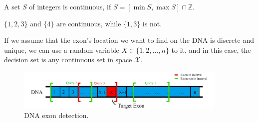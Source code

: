 \begin{definition}
A set $S$ of integers is continuous, if $S = [\min S, \max S] \cap \mathbb{Z}$.
\end{definition}

\begin{example}
$\{1,2,3\}$ and $\{4\}$ are continuous, while $\{1,3\}$ is not.
\end{example}

If we assume that the exon's location we want to find on the DNA is discrete and unique, we can use a random variable $X\in \{1,2,\dots, n\}$ to it, and in this case, the decision set is any continuous set in space $\mathcal{X}$.

\begin{figure}
    \centering
    \includegraphics[width=0.9\textwidth]{figure/Exon.png}
    \caption{DNA exon detection.}
    \label{fig:exon}
\end{figure}

